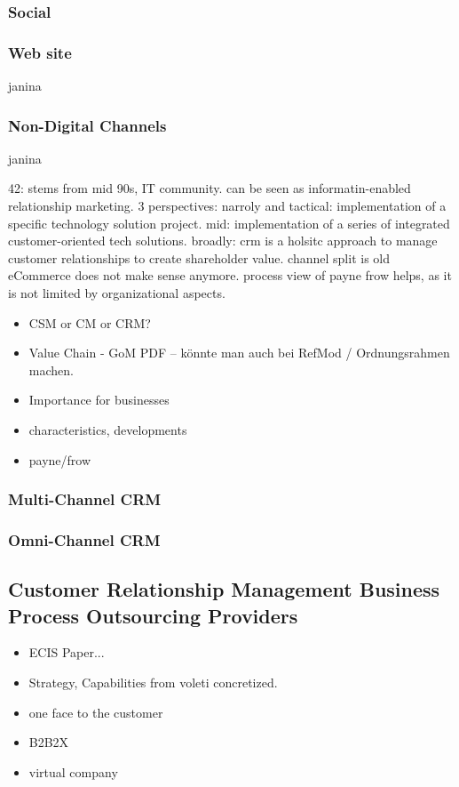 		\subsubsection{Social}
		
		\subsubsection{Web site}
		
		
		
	
			
		
		janina
		\subsubsection{Non-Digital Channels}
		
		janina
		
		42: stems from mid 90s, IT community. can be seen as informatin-enabled relationship marketing. 3 perspectives: narroly and tactical: implementation of a specific technology solution project. mid: implementation of a series of integrated customer-oriented tech solutions. broadly: crm is a holsitc approach to manage customer relationships to create shareholder value. channel split is old eCommerce does not make sense anymore.
		process view of payne frow helps, as it is not limited by organizational aspects. 
				\begin{itemize}
			\item CSM or CM or CRM?
			\item Value Chain - GoM PDF -- könnte man auch bei RefMod / Ordnungsrahmen machen. 			
			\item Importance for businesses
			\item characteristics, developments 
			\item payne/frow
		\end{itemize}
	
	\subsubsection{Multi-Channel CRM}
	\subsubsection{Omni-Channel CRM}
	 
		\subsection{Customer Relationship Management Business Process Outsourcing Providers}
		\begin{itemize}
			\item ECIS Paper...
			\item Strategy, Capabilities from voleti concretized. 
			\item one face to the customer
			\item B2B2X
			\item virtual company
		\end{itemize}
